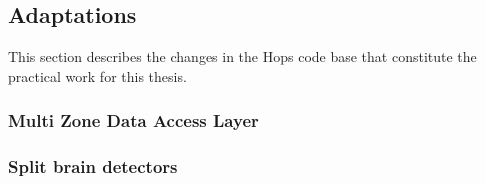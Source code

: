 \subsection{Adaptations}
This section describes the changes in the Hops code base that constitute the practical work for this thesis.

\subsubsection{Multi Zone Data Access Layer}

\subsubsection{Split brain detectors}